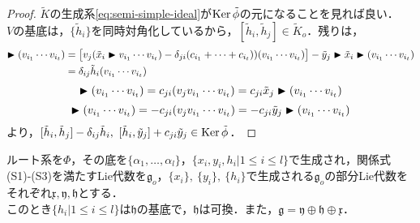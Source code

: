 \documentclass[rep_main]{subfiles}
\begin{document}
\begin{proof}
	$\tilde{K}$の生成系\eqref{eq:semi-simple-ideal}が$\operatorname{Ker}\tilde{\phi}$の元になることを見れば良い．\\
	$V$の基底は，$\{\tilde{h}_i\}$を同時対角化しているから，$[\tilde{h}_i, \tilde{h}_j] \in \tilde{K}_o$．残りは，
	\begin{align}
		[\tilde{x}_i, \tilde{y}_j] \btr (v_{i_1}\cdots v_{i_t}) &= \bigl[v_j(\tilde{x}_i \btr v_{i_1}\cdots v_{i_t}) - \delta_{ji}(c_{i_1} + \cdots + c_{i_t}))(v_{i_1}\cdots v_{i_t})\bigr] - \tilde{y}_j \btr \tilde{x}_i \btr (v_{i_1}\cdots v_{i_t}) \\
		&= \delta_{ij}\tilde{h}_i(v_{i_1}\cdots v_{i_t})
	\end{align}
	\begin{equation}
		[\tilde{h}_i, \tilde{x}_j] \btr (v_{i_1}\cdots v_{i_t}) = c_{ji}(v_jv_{i_1}\cdots v_{i_t}) = c_{ji}\tilde{x}_j \btr (v_{i_1}\cdots v_{i_t})
	\end{equation}
	\begin{equation}
		[\tilde{h}_i, \tilde{y}_j] \btr (v_{i_1}\cdots v_{i_t}) = -c_{ji}(v_jv_{i_1}\cdots v_{i_t}) = -c_{ji}\tilde{y}_j \btr (v_{i_1}\cdots v_{i_t})
	\end{equation}
	より，$[\tilde{h}_i, \tilde{h}_j] - \delta_{ij}\tilde{h}_i,\ [\tilde{h}_i, \tilde{y}_j] + c_{ji}\tilde{y}_j \in \operatorname{Ker}\tilde{\phi}$．
\end{proof}
\begin{mytheo}[label=thm:]{}
	ルート系を$\Phi$，その底を$\{\alpha_1, \ldots, \alpha_l\}$，$\{x_i, y_i, h_i | 1 \leq i \leq l\}$で生成され，関係式(S1)-(S3)を満たすLie代数を$\mathfrak{g}_o$，$\{x_i\},\ \{y_i\},\ \{h_i\}$で生成される$\mathfrak{g}_o$の部分Lie代数をそれぞれ$\mathfrak{x}, \mathfrak{y}, \mathfrak{h}$とする．\\
	このとき$\{h_i | 1 \leq i \leq l\}$は$\mathfrak{h}$の基底で，$\mathfrak{h}$は可換．また，$\mathfrak{g} = \mathfrak{y} \oplus \mathfrak{h} \oplus \mathfrak{x}$．
\end{mytheo}
\end{document}
